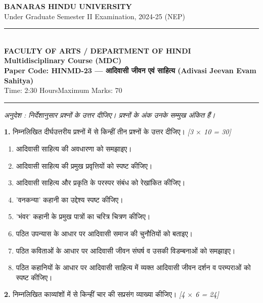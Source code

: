 \documentclass[11pt,a4paper]{article}
\newcommand{\pts}[1]{\hfill \textit{[#1]}}
\begin{document}
\begin{center}
  {\large\bfseries BANARAS HINDU UNIVERSITY}\\[2pt]
  {\normalsize Under Graduate Semester II Examination, 2024-25 (NEP)}\\[6pt]
  \rule{0.8\linewidth}{0.5pt}\\[6pt]
  {\large\bfseries FACULTY OF ARTS / DEPARTMENT OF HINDI}\\[4pt]
  {\large\bfseries Multidisciplinary Course (MDC)}\\[4pt]
  {\large\bfseries Paper Code: HINMD-23 --- आदिवासी जीवन एवं साहित्य (Adivasi Jeevan Evam Sahitya)}\\[4pt]
  {\normalsize Time: 2:30 Hours\hfill Maximum Marks: 70}
\end{center}

\rule{\linewidth}{0.4pt}\smallskip

\noindent \textit{अनुदेश : निर्देशानुसार प्रश्नों के उत्तर दीजिए। प्रश्नों के अंक उनके सम्मुख अंकित हैं।}

\bigskip

\noindent \textbf{1.} निम्नलिखित दीर्घउत्तरीय प्रश्नों में से किन्हीं तीन प्रश्नों के उत्तर दीजिए। \pts{3 $\times$ 10 = 30}

\begin{enumerate}[label=(\roman*)]
  \item आदिवासी साहित्य की अवधारणा को समझाइए।
  \item आदिवासी साहित्य की प्रमुख प्रवृत्तियों को स्पष्ट कीजिए।
  \item आदिवासी साहित्य और प्रकृति के परस्पर संबंध को रेखांकित कीजिए।
  \item 'वनकन्या' कहानी का उद्देश्य स्पष्ट कीजिए।
  \item 'भंवर' कहानी के प्रमुख पात्रों का चरित्र चित्रण कीजिए।
  \item पठित उपन्यास के आधार पर आदिवासी समाज की चुनौतियों को बताइए।
  \item पठित कविताओं के आधार पर आदिवासी जीवन संघर्ष व उसकी विडम्बनाओं को समझाइए।
  \item पठित कहानियों के आधार पर आदिवासी साहित्य में व्यक्त आदिवासी जीवन दर्शन व परम्पराओं को स्पष्ट कीजिए।
\end{enumerate}

\bigskip

\noindent \textbf{2.} निम्नलिखित काव्यांशों में से किन्हीं चार की सप्रसंग व्याख्या कीजिए। \pts{4 $\times$ 6 = 24}
\end{document}
